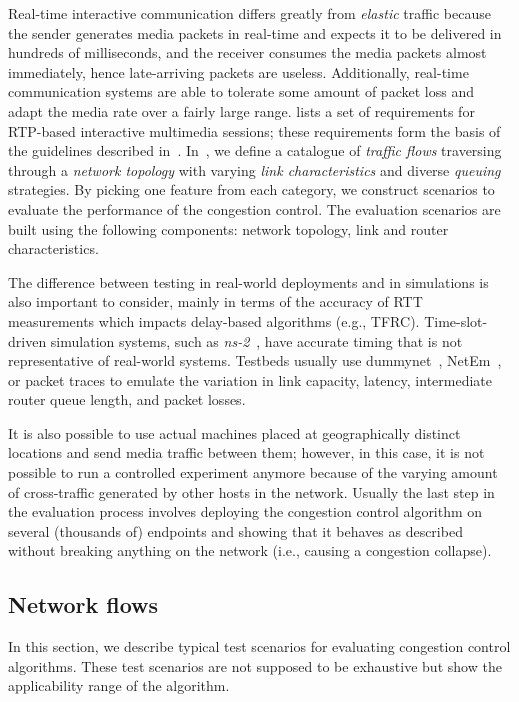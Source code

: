 Real-time interactive communication differs greatly from \emph{elastic}
traffic because the sender generates media packets in real-time and expects it
to be delivered in hundreds of milliseconds, and the receiver consumes the media
packets almost immediately, hence late-arriving packets are useless.
Additionally, real-time communication systems are able to tolerate some amount
of packet loss and adapt the media rate over a fairly large range.
\cite{draft.rmcat.req} lists a set of requirements for RTP-based interactive
multimedia sessions; these requirements form the basis of the guidelines
described in~\cite{draft.rmcat.evaluate}. In~\cite{draft.rmcat.eval.test}, we
define a catalogue of \emph{traffic flows} traversing through a \emph{network
topology} with varying \emph{link characteristics} and diverse \emph{queuing}
strategies. By picking one feature from each category, we
construct scenarios to evaluate the performance of the congestion control. The
evaluation scenarios are built using the following components: network
topology, link and router characteristics.

The difference between testing in real-world deployments and in simulations is
also important to consider, mainly in terms of the accuracy of RTT
measurements which impacts delay-based algorithms (e.g., TFRC). Time-slot-driven
simulation systems, such as \emph{ns-2}~\cite{ns2}, have accurate timing that
is not representative of real-world systems. Testbeds usually use
dummynet~\cite{Carbone:2010p3502}, NetEm~\cite{netem}, or packet traces to
emulate the variation in link capacity, latency, intermediate router queue
length, and packet losses. 

It is also possible to use actual machines placed at geographically distinct
locations and send media traffic between them; however, in this case, it is
not possible to run a controlled experiment anymore because of the varying
amount of cross-traffic generated by other hosts in the network. Usually the
last step in the evaluation process involves deploying the congestion control
algorithm on several (thousands of) endpoints and showing that it behaves as
described without breaking anything on the network (i.e., causing a congestion
collapse).

\subsection{Network flows}

In this section, we describe typical test scenarios for evaluating congestion
control algorithms. These test scenarios are not supposed to be exhaustive
but show the applicability range of the algorithm.

